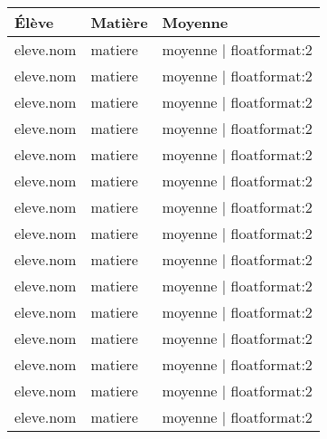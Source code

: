 \documentclass[10pt,a4paper]{article}
\begin{document}
\begin{longtable}{|l|l|l|} \hline
\textbf{Élève} & \textbf{Matière} & \textbf{Moyenne} \\ \hline


{{ eleve.nom }} & {{ matiere }} & {{ moyenne | floatformat:2 }} \\ \hline

{{ eleve.nom }} & {{ matiere }} & {{ moyenne | floatformat:2 }} \\ \hline

{{ eleve.nom }} & {{ matiere }} & {{ moyenne | floatformat:2 }} \\ \hline

{{ eleve.nom }} & {{ matiere }} & {{ moyenne | floatformat:2 }} \\ \hline

{{ eleve.nom }} & {{ matiere }} & {{ moyenne | floatformat:2 }} \\ \hline



{{ eleve.nom }} & {{ matiere }} & {{ moyenne | floatformat:2 }} \\ \hline

{{ eleve.nom }} & {{ matiere }} & {{ moyenne | floatformat:2 }} \\ \hline

{{ eleve.nom }} & {{ matiere }} & {{ moyenne | floatformat:2 }} \\ \hline

{{ eleve.nom }} & {{ matiere }} & {{ moyenne | floatformat:2 }} \\ \hline

{{ eleve.nom }} & {{ matiere }} & {{ moyenne | floatformat:2 }} \\ \hline



{{ eleve.nom }} & {{ matiere }} & {{ moyenne | floatformat:2 }} \\ \hline

{{ eleve.nom }} & {{ matiere }} & {{ moyenne | floatformat:2 }} \\ \hline

{{ eleve.nom }} & {{ matiere }} & {{ moyenne | floatformat:2 }} \\ \hline

{{ eleve.nom }} & {{ matiere }} & {{ moyenne | floatformat:2 }} \\ \hline

{{ eleve.nom }} & {{ matiere }} & {{ moyenne | floatformat:2 }} \\ \hline




\end{longtable}
\end{document}
